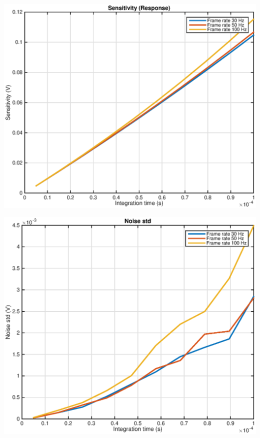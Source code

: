 \begin{center}
\includegraphics[scale=0.35]{gfx/Response_Function_of_Integration_Time.eps} 	 
\end{center}

\begin{center}
\includegraphics[scale=0.35]{gfx/STD_Function_of_Integration_Time.eps} 	 
\end{center}

